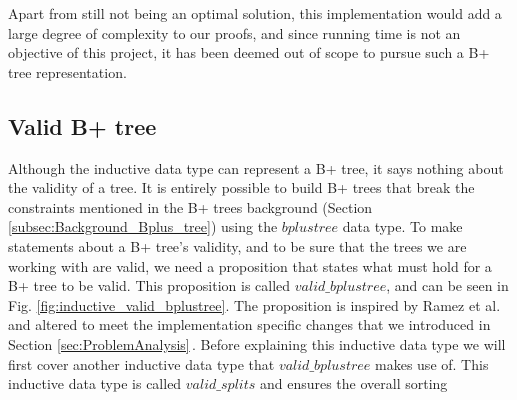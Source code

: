 Apart from still not being an optimal solution, this implementation would add a large degree of complexity to our proofs, and since running time is not an objective of this project, it has been deemed out of scope to pursue such a B+ tree representation.


\subsection{Valid B+ tree}
\label{subsec:Valid_bplustree}
Although the inductive data type can represent a B+ tree, it says nothing about the validity of a tree. It is entirely possible to build B+ trees that break the constraints mentioned in the B+ trees background (Section \ref{subsec:Background_Bplus_tree}) using the $bplustree$ data type. To make statements about a B+ tree's validity, and to be sure that the trees we are working with are valid, we need a proposition that states what must hold for a B+ tree to be valid. This proposition is called $valid\_bplustree$, and can be seen in Fig. \ref{fig:inductive_valid_bplustree}. The proposition is inspired by Ramez et al. and altered to meet the implementation specific changes that we introduced in Section \ref{sec:ProblemAnalysis}\,\cite[pp. 652]{Elmasri1999}. Before explaining this inductive data type we will first cover another inductive data type that $valid\_bplustree$ makes use of. This inductive data type is called $valid\_splits$ and ensures the overall sorting


